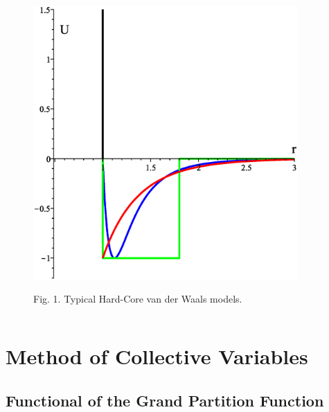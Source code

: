 \documentclass[8pt]{beamer}
\begin{document}
\begin{frame}
\begin{columns}
				\begin{figure}[htbp]
				\includegraphics[width=0.9\textwidth,angle=0]{hc_vdW_fluids} \\
				\parbox{0.8\textwidth}{\caption*{Fig. 1. Typical Hard-Core van der Waals models.
				}} \hfill
			\end{figure}
		\end{columns}
		
	\end{frame}
	
	\section{Method of Collective Variables}
	\subsection{Functional of the Grand Partition Function}
	
\end{document}

